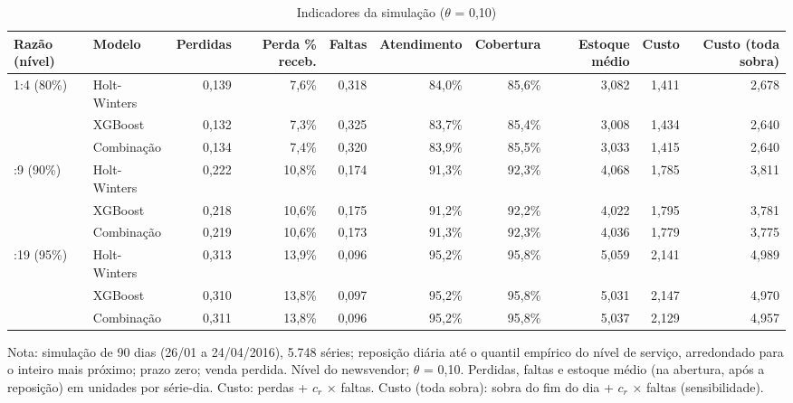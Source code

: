 \begin{table}[htbp]
\centering
\small
\caption{Indicadores da simulação ($\theta$ = 0,10)}
\label{tab:sim_indicadores}
\begin{tabular}{llrrrrrrrr}
\toprule
Razão (nível) & Modelo & Perdidas & Perda \% receb. & Faltas & Atendimento & Cobertura & Estoque médio & Custo & Custo (toda sobra) \\
\midrule
1:4 (80\%) & Holt-Winters & 0,139 & 7,6\% & 0,318 & 84,0\% & 85,6\% & 3,082 & 1,411 & 2,678 \\
 & XGBoost & 0,132 & 7,3\% & 0,325 & 83,7\% & 85,4\% & 3,008 & 1,434 & 2,640 \\
 & Combinação & 0,134 & 7,4\% & 0,320 & 83,9\% & 85,5\% & 3,033 & 1,415 & 2,640 \\
\addlinespace
1:9 (90\%) & Holt-Winters & 0,222 & 10,8\% & 0,174 & 91,3\% & 92,3\% & 4,068 & 1,785 & 3,811 \\
 & XGBoost & 0,218 & 10,6\% & 0,175 & 91,2\% & 92,2\% & 4,022 & 1,795 & 3,781 \\
 & Combinação & 0,219 & 10,6\% & 0,173 & 91,3\% & 92,3\% & 4,036 & 1,779 & 3,775 \\
\addlinespace
1:19 (95\%) & Holt-Winters & 0,313 & 13,9\% & 0,096 & 95,2\% & 95,8\% & 5,059 & 2,141 & 4,989 \\
 & XGBoost & 0,310 & 13,8\% & 0,097 & 95,2\% & 95,8\% & 5,031 & 2,147 & 4,970 \\
 & Combinação & 0,311 & 13,8\% & 0,096 & 95,2\% & 95,8\% & 5,037 & 2,129 & 4,957 \\
\bottomrule
\end{tabular}
\par\smallskip
{\footnotesize Nota: simulação de 90 dias (26/01 a 24/04/2016), 5.748 séries; reposição diária até o quantil empírico do nível de serviço, arredondado para o inteiro mais próximo; prazo zero; venda perdida. Nível do newsvendor; $\theta$ = 0,10. Perdidas, faltas e estoque médio (na abertura, após a reposição) em unidades por série-dia. Custo: perdas + $c_r$ × faltas. Custo (toda sobra): sobra do fim do dia + $c_r$ × faltas (sensibilidade).}
\end{table}
